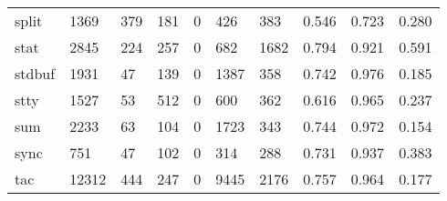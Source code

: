 \begin{longtable}{lp{2.0cm}p{2.0cm}p{2.0cm}p{2.0cm}p{2.0cm}p{2.0cm}p{2.0cm}p{2.0cm}p{2.0cm}}
split     &                   1369 &                                379 &                               181 &                                0 &                               426 &                             383 &                                0.546 &                                  0.723 &                                0.280 \\
stat      &                   2845 &                                224 &                               257 &                                0 &                               682 &                            1682 &                                0.794 &                                  0.921 &                                0.591 \\
stdbuf    &                   1931 &                                 47 &                               139 &                                0 &                              1387 &                             358 &                                0.742 &                                  0.976 &                                0.185 \\
stty      &                   1527 &                                 53 &                               512 &                                0 &                               600 &                             362 &                                0.616 &                                  0.965 &                                0.237 \\
sum       &                   2233 &                                 63 &                               104 &                                0 &                              1723 &                             343 &                                0.744 &                                  0.972 &                                0.154 \\
sync      &                    751 &                                 47 &                               102 &                                0 &                               314 &                             288 &                                0.731 &                                  0.937 &                                0.383 \\
tac       &                  12312 &                                444 &                               247 &                                0 &                              9445 &                            2176 &                                0.757 &                                  0.964 &                                0.177 \\

\end{longtable}
